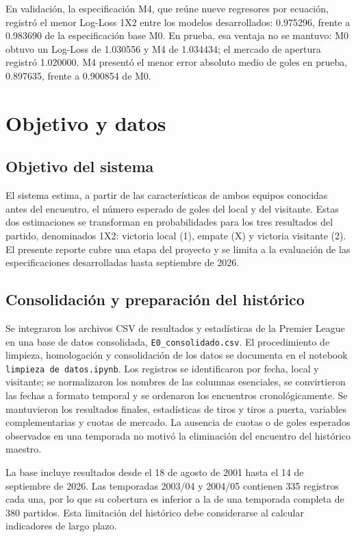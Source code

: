 \documentclass[11pt,a4paper]{article}
\newcommand{\code}[1]{\texttt{#1}}
\begin{document}
En validación, la especificación M4, que reúne nueve regresores por ecuación, registró el menor Log-Loss 1X2 entre los modelos desarrollados: 0.975296, frente a 0.983690 de la especificación base M0. En prueba, esa ventaja no se mantuvo: M0 obtuvo un Log-Loss de 1.030556 y M4 de 1.034434; el mercado de apertura registró 1.020000. M4 presentó el menor error absoluto medio de goles en prueba, 0.897635, frente a 0.900854 de M0.

\section{Objetivo y datos}
\subsection{Objetivo del sistema}
El sistema estima, a partir de las características de ambos equipos conocidas antes del encuentro, el número esperado de goles del local y del visitante. Estas dos estimaciones se transforman en probabilidades para los tres resultados del partido, denominados 1X2: victoria local (1), empate (X) y victoria visitante (2). El presente reporte cubre una etapa del proyecto y se limita a la evaluación de las especificaciones desarrolladas hasta septiembre de 2026.

\subsection{Consolidación y preparación del histórico}
Se integraron los archivos CSV de resultados y estadísticas
de la Premier League en una base de datos consolidada,
\code{E0\_consolidado.csv}. El procedimiento de limpieza,
homologación y consolidación de los datos se documenta en
el notebook \code{limpieza de datos.ipynb}. Los registros se identificaron por fecha, local y visitante; se normalizaron los nombres de las columnas esenciales, se convirtieron las fechas a formato temporal y se ordenaron los encuentros cronológicamente. Se mantuvieron los resultados finales, estadísticas de tiros y tiros a puerta, variables complementarias y cuotas de mercado. La ausencia de cuotas o de goles esperados observados en una temporada no motivó la eliminación del encuentro del histórico maestro.

La base incluye resultados desde el 18 de agosto de 2001 hasta el 14 de septiembre de 2026. Las temporadas 2003/04 y 2004/05 contienen 335 registros cada una, por lo que su cobertura es inferior a la de una temporada completa de 380 partidos. Esta limitación del histórico debe considerarse al calcular indicadores de largo plazo.
\end{document}
